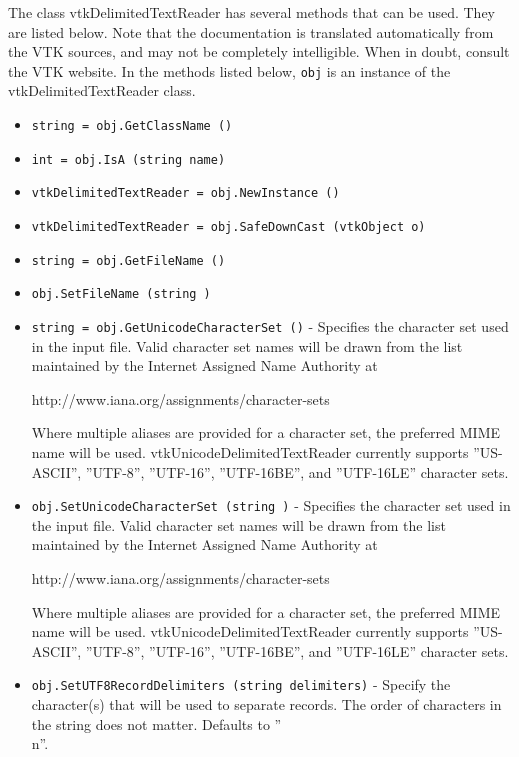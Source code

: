 The class vtkDelimitedTextReader has several methods that can be used.
  They are listed below.
Note that the documentation is translated automatically from the VTK sources,
and may not be completely intelligible.  When in doubt, consult the VTK website.
In the methods listed below, \verb|obj| is an instance of the vtkDelimitedTextReader class.
\begin{itemize}
\item  \verb|string = obj.GetClassName ()|

\item  \verb|int = obj.IsA (string name)|

\item  \verb|vtkDelimitedTextReader = obj.NewInstance ()|

\item  \verb|vtkDelimitedTextReader = obj.SafeDownCast (vtkObject o)|

\item  \verb|string = obj.GetFileName ()|

\item  \verb|obj.SetFileName (string )|

\item  \verb|string = obj.GetUnicodeCharacterSet ()| -  Specifies the character set used in the input file.  Valid character set
 names will be drawn from the list maintained by the Internet Assigned Name
 Authority at

   http://www.iana.org/assignments/character-sets

 Where multiple aliases are provided for a character set, the preferred MIME name
 will be used.  vtkUnicodeDelimitedTextReader currently supports ''US-ASCII'', ''UTF-8'',
 ''UTF-16'', ''UTF-16BE'', and ''UTF-16LE'' character sets.

\item  \verb|obj.SetUnicodeCharacterSet (string )| -  Specifies the character set used in the input file.  Valid character set
 names will be drawn from the list maintained by the Internet Assigned Name
 Authority at

   http://www.iana.org/assignments/character-sets

 Where multiple aliases are provided for a character set, the preferred MIME name
 will be used.  vtkUnicodeDelimitedTextReader currently supports ''US-ASCII'', ''UTF-8'',
 ''UTF-16'', ''UTF-16BE'', and ''UTF-16LE'' character sets.

\item  \verb|obj.SetUTF8RecordDelimiters (string delimiters)| -  Specify the character(s) that will be used to separate records.
 The order of characters in the string does not matter.  Defaults
 to ''\r\\n''.


\end{itemize}
